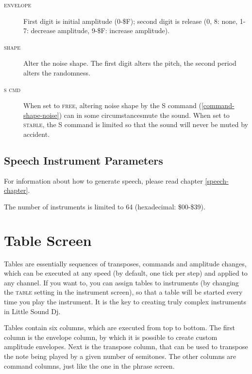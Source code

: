 \begin{description}
	\item[\textsc{envelope}] First digit is initial amplitude (0-\$F); second digit is release (0, 8: none, 1-7: decrease amplitude, 9-\$F: increase amplitude).
	\item[\textsc{shape}] Alter the noise shape. The first digit alters the pitch, the second
period alters the randomness.
	\item[\textsc{s cmd}] When set to \textsc{free}, altering noise shape by the \textsc{S}
command (\ref{command-shape-noise}) can in some circumstances\footnotemark mute the sound. When set to \textsc{stable}, the
\textsc{S} command is limited so that the sound will never be muted by accident.
\end{description}

\subsection{Speech Instrument Parameters}

For information about how to generate speech, please read chapter \ref{speech-chapter}.

The number of instruments is limited to 64 (hexadecimal: \$00-\$39).

\section{Table Screen}

Tables are essentially sequences of transposes, commands and amplitude changes, which can be executed at any speed (by default, one tick per step) and applied to any channel. If you want to, you can assign tables to instruments (by changing the \textsc{table} setting in the instrument screen), so that a table will be started every time you play the instrument. It is the key to creating truly complex instruments in Little Sound Dj.

Tables contain six columns, which are executed from top to bottom.
The first column is the envelope column, by which it is possible to create custom amplitude envelopes. Next is the transpose column, that can be used to transpose the note being played by a given number of semitones. The other columns are command columns, just like the one in the phrase screen.

